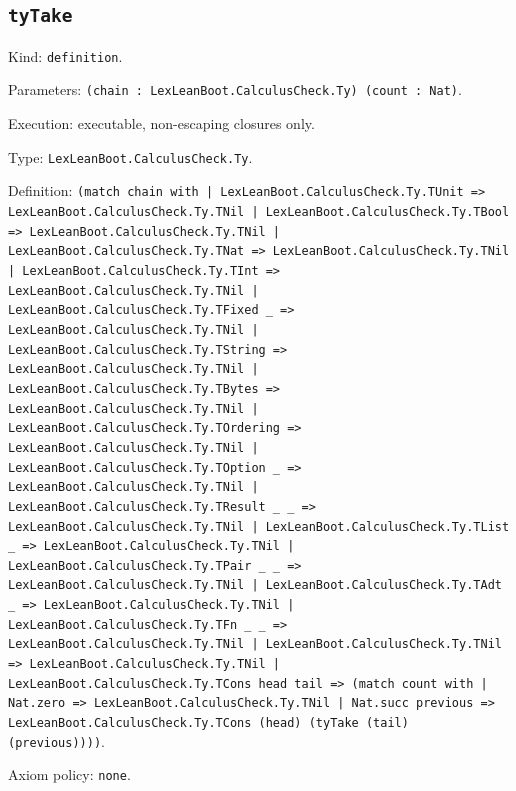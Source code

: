 \documentclass[11pt]{article}
\begin{document}
\subsection*{\texttt{tyTake}}
\noindent Kind: \texttt{definition}.\par
\noindent Parameters: \texttt{(chain : LexLeanBoot.CalculusCheck.Ty) (count : Nat)}.\par
\noindent Execution: executable, non-escaping closures only.\par
\noindent Type: \texttt{LexLeanBoot.CalculusCheck.Ty}.\par
\noindent Definition: \texttt{(match chain with | LexLeanBoot.CalculusCheck.Ty.TUnit => LexLeanBoot.CalculusCheck.Ty.TNil | LexLeanBoot.CalculusCheck.Ty.TBool => LexLeanBoot.CalculusCheck.Ty.TNil | LexLeanBoot.CalculusCheck.Ty.TNat => LexLeanBoot.CalculusCheck.Ty.TNil | LexLeanBoot.CalculusCheck.Ty.TInt => LexLeanBoot.CalculusCheck.Ty.TNil | LexLeanBoot.CalculusCheck.Ty.TFixed \_ => LexLeanBoot.CalculusCheck.Ty.TNil | LexLeanBoot.CalculusCheck.Ty.TString => LexLeanBoot.CalculusCheck.Ty.TNil | LexLeanBoot.CalculusCheck.Ty.TBytes => LexLeanBoot.CalculusCheck.Ty.TNil | LexLeanBoot.CalculusCheck.Ty.TOrdering => LexLeanBoot.CalculusCheck.Ty.TNil | LexLeanBoot.CalculusCheck.Ty.TOption \_ => LexLeanBoot.CalculusCheck.Ty.TNil | LexLeanBoot.CalculusCheck.Ty.TResult \_ \_ => LexLeanBoot.CalculusCheck.Ty.TNil | LexLeanBoot.CalculusCheck.Ty.TList \_ => LexLeanBoot.CalculusCheck.Ty.TNil | LexLeanBoot.CalculusCheck.Ty.TPair \_ \_ => LexLeanBoot.CalculusCheck.Ty.TNil | LexLeanBoot.CalculusCheck.Ty.TAdt \_ => LexLeanBoot.CalculusCheck.Ty.TNil | LexLeanBoot.CalculusCheck.Ty.TFn \_ \_ => LexLeanBoot.CalculusCheck.Ty.TNil | LexLeanBoot.CalculusCheck.Ty.TNil => LexLeanBoot.CalculusCheck.Ty.TNil | LexLeanBoot.CalculusCheck.Ty.TCons head tail => (match count with | Nat.zero => LexLeanBoot.CalculusCheck.Ty.TNil | Nat.succ previous => LexLeanBoot.CalculusCheck.Ty.TCons (head) (tyTake (tail) (previous))))}.\par
\noindent Axiom policy: \texttt{none}.\par
\end{document}

